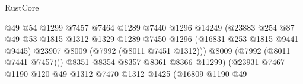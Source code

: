 \begin{lexlean}{RustCore}
\begin{coremodule}
                                                    @49
                                                    @54
                                                    @1299
                                                    @7457
                                                    @7464
                                                    @1289
                                                    @7440
                                                    @1296
                                                    @14249
                                                    (@23883
                                                      @254
                                                      @87
                                                      @49
                                                      @53
                                                      @1815
                                                      @1312
                                                      @1329
                                                      @1289
                                                      @7450
                                                      @1296
                                                      (@16831 @253 @1815 @9441 @9445)
                                                      @23907
                                                      @8009
                                                      (@7992 (@8011 @7451 @1312)))
                                                    @8009
                                                    (@7992 (@8011 @7441 @7457)))
                                                  @8351
                                                  @8354
                                                  @8357
                                                  @8361
                                                  @8366
                                                  @11299)
                                                (@23931
                                                  @7467
                                                  @1190
                                                  @120
                                                  @49
                                                  @1312
                                                  @7470
                                                  @1312
                                                  @1425
                                                  (@16809
                                                    @1190
                                                    @49

\end{coremodule}
\end{lexlean}
